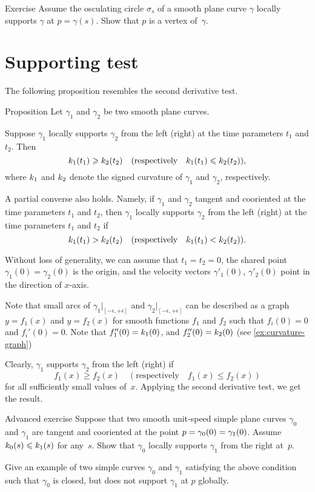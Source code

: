 \begin{thm}{Exercise}\label{ex:vertex-support}
Assume the osculating circle $\sigma_s$ of a smooth plane curve $\gamma$ locally supports $\gamma$ at $p=\gamma(s)$.
Show that $p$ is a vertex of~$\gamma$.
\end{thm}

\section{Supporting test}

The following proposition resembles the second derivative test. 

\begin{thm}{Proposition}\label{prop:supporting-circline}
Let $\gamma_1$ and $\gamma_2$ be two smooth plane curves.

Suppose $\gamma_1$ locally supports $\gamma_2$ from the left (right) at the time parameters $t_1$ and $t_2$.
Then 
\[k_1(t_1)\geqslant k_2(t_2)\quad(\text{respectively}\quad k_1(t_1)\leqslant k_2(t_2)),\]
where $k_1$ and $k_2$ denote the signed curvature of $\gamma_1$ and $\gamma_2$, respectively.

A partial converse also holds.
Namely, if $\gamma_1$ and $\gamma_2$ tangent and cooriented at the time parameters $t_1$ and $t_2$,
then $\gamma_1$ locally supports $\gamma_2$ from the left (right) at the time parameters $t_1$ and $t_2$
if 
\[k_1(t_1)> k_2(t_2)\quad(\text{respectively}\quad k_1(t_1)< k_2(t_2)).\]

\end{thm}

 Without loss of generality, we can assume that $t_1=t_2=0$, the shared point $\gamma_1(0)=\gamma_2(0)$ is the origin, and the velocity vectors $\gamma'_1(0)$, $\gamma'_2(0)$ point in the direction of $x$-axis.

Note that small arcs of $\gamma_1|_{[-\epsilon,+\epsilon]}$ and  $\gamma_2|_{[-\epsilon,+\epsilon]}$ can be described as a graph 
$y=f_1(x)$ and $y=f_2(x)$ for smooth functions $f_1$ and $f_2$ such that $f_i(0)=0$ and $f_i'(0)=0$.
Note that $f_1''(0)=k_1(0)$, and $f_2''(0)=k_2(0)$ (see \ref{ex:curvature-graph})

Clearly, $\gamma_1$ supports $\gamma_2$ from the left (right) if 
\[f_1(x)\ge f_2(x)\quad(\text{respectively}\quad f_1(x)\le f_2(x))\]
for all sufficiently small values of~$x$.
Applying the second derivative test, we get the result.
\qeds


\begin{thm}{Advanced exercise}\label{ex:support}
Suppose that two smooth unit-speed simple plane curves $\gamma_0$ and $\gamma_1$ are tangent and cooriented at the point $p\z=\gamma_0(0)\z=\gamma_1(0)$.
Assume $k_0(s)\leqslant k_1(s)$ for any~$s$.
Show that $\gamma_0$ locally supports $\gamma_1$ from the right at~$p$.

Give an example of two simple curves $\gamma_0$ and $\gamma_1$ satisfying the above condition such that $\gamma_0$ is closed, but does not support $\gamma_1$ at $p$ globally.
\end{thm}


